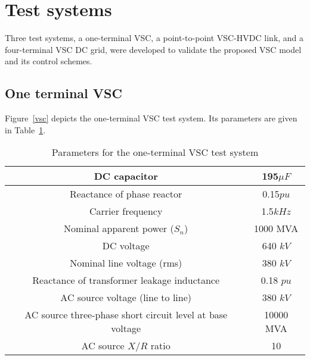 \documentclass[conference]{IEEEtran}
\begin{document}
%
\section{Test systems}
Three test systems, a one-terminal VSC, a point-to-point VSC-HVDC link, and a four-terminal VSC DC grid, were developed to validate the proposed VSC model and its control schemes.   
\subsection{One terminal VSC}
Figure~\ref{vsc} depicts the one-terminal VSC test system. Its parameters are given in Table~\ref{oneterminal}.
\begin{table}[!ht]
\centering
\caption{Parameters for the one-terminal VSC test system}
\begin{tabular}{| c | c |}
\hline
DC capacitor & 195$\mu F$ \\\hline
Reactance of phase reactor & 0.15$pu$ \\\hline
Carrier frequency & 1.5$kHz$ \\\hline
Nominal apparent power ($S_n$) & 1000 MVA  \\\hline
DC voltage & 640 $kV$ \\\hline
Nominal line voltage (rms) & 380 $kV$ \\\hline
Reactance of transformer leakage inductance & 0.18 $pu$ \\\hline
AC source voltage (line to line) & 380 $kV$ \\\hline
AC source three-phase short circuit level at base voltage & 10000 MVA \\\hline
AC source $X/R$ ratio & 10 \\\hline
\end{tabular}
\label{oneterminal}
\end{table}
\end{document}

